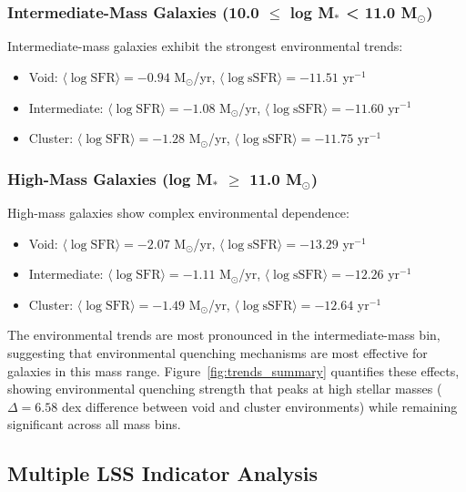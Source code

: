 \documentclass[twocolumn]{aastex701}
\begin{document}
\subsubsection{Intermediate-Mass Galaxies (10.0 $\leq$ log M$_*$ < 11.0 M$_\odot$)}

Intermediate-mass galaxies exhibit the strongest environmental trends:
\begin{itemize}
\item Void: $\langle \log \text{SFR} \rangle = -0.94$ M$_\odot$/yr, $\langle \log \text{sSFR} \rangle = -11.51$ yr$^{-1}$
\item Intermediate: $\langle \log \text{SFR} \rangle = -1.08$ M$_\odot$/yr, $\langle \log \text{sSFR} \rangle = -11.60$ yr$^{-1}$
\item Cluster: $\langle \log \text{SFR} \rangle = -1.28$ M$_\odot$/yr, $\langle \log \text{sSFR} \rangle = -11.75$ yr$^{-1}$
\end{itemize}

\subsubsection{High-Mass Galaxies (log M$_*$ $\geq$ 11.0 M$_\odot$)}

High-mass galaxies show complex environmental dependence:
\begin{itemize}
\item Void: $\langle \log \text{SFR} \rangle = -2.07$ M$_\odot$/yr, $\langle \log \text{sSFR} \rangle = -13.29$ yr$^{-1}$
\item Intermediate: $\langle \log \text{SFR} \rangle = -1.11$ M$_\odot$/yr, $\langle \log \text{sSFR} \rangle = -12.26$ yr$^{-1}$
\item Cluster: $\langle \log \text{SFR} \rangle = -1.49$ M$_\odot$/yr, $\langle \log \text{sSFR} \rangle = -12.64$ yr$^{-1}$
\end{itemize}

The environmental trends are most pronounced in the intermediate-mass bin, suggesting that environmental quenching mechanisms are most effective for galaxies in this mass range. Figure~\ref{fig:trends_summary} quantifies these effects, showing environmental quenching strength that peaks at high stellar masses ($\Delta = 6.58$ dex difference between void and cluster environments) while remaining significant across all mass bins.

\subsection{Multiple LSS Indicator Analysis}
\end{document}
